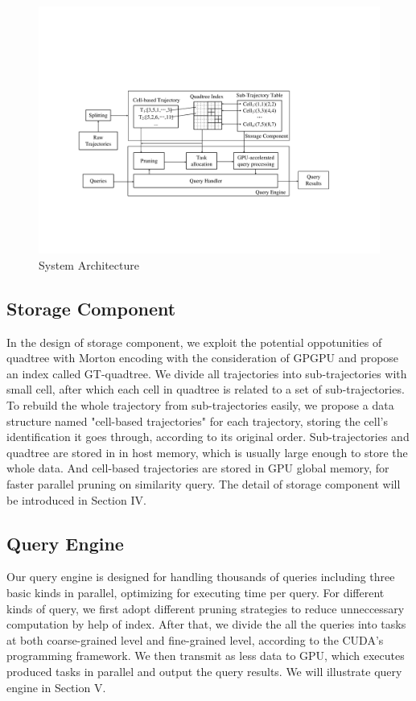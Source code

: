 \documentclass[conference]{IEEEtran}
\begin{document}
\begin{figure}[htbp]\centering
	\includegraphics[width=16cm]{pdf/architecture1.pdf}
	\caption{System Architecture\label{fig:Archi}}
\end{figure}

\subsection{Storage Component}
In the design of storage component, we exploit the potential oppotunities of quadtree with Morton encoding\cite{DBLP:conf/gis/LettichOS15} with the consideration of GPGPU and propose an index called GT-quadtree. We divide all trajectories into sub-trajectories with small cell, after which each cell in quadtree is related to a set of sub-trajectories. To rebuild the whole trajectory from sub-trajectories easily, we propose a data structure named "cell-based trajectories" for each trajectory, storing the cell's identification it goes through, according to its original order. Sub-trajectories and quadtree are stored in in host memory, which is usually large enough to store the whole data. And cell-based trajectories are stored in GPU global memory, for faster parallel pruning on similarity query. The detail of storage component will be introduced in Section IV.

\subsection{Query Engine}
Our query engine is designed for handling thousands of queries including three basic kinds in parallel, optimizing for executing time per query. For different kinds of query, we first adopt different pruning strategies to reduce unneccessary computation by help of index. After that, we divide the all the queries into tasks at both coarse-grained level and fine-grained level, according to the CUDA's programming framework. We then transmit as less data to GPU, which executes produced tasks in parallel and output the query results. We will illustrate query engine in Section V.
\end{document}
